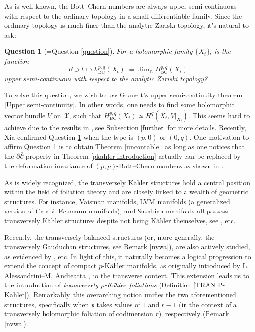 \documentclass[12pt]{amsart}
\numberwithin{equation}{section}
\theoremstyle{definition}
\theoremstyle{definition}
\theoremstyle{definition}
\renewcommand{\1}{\mathsf{1}}
\renewcommand{\>}{\rightarrow}
\newcommand{\p}{\partial}
\newcommand{\bp}{\overline\partial}
\def\p{\partial}
\theoremstyle{plain} %
\theoremstyle{plain} %
\newtheorem{bigque}{Question}
\theoremstyle{plain} %
\begin{document}
	As is well known,  the Bott--Chern numbers are  always upper semi-continuous with respect to the ordinary topology in a small differentiable family. Since the ordinary topology is much finer than  the analytic Zariski topology, it's natural to ask:
	\begin{bigque}[{=Question \ref{question}}] \label{question!!!}
		For a holomorphic family $\{X_t\}$,
		is the function
		$$B\ni t\longmapsto h^{p,q}_{\mathrm {BC}}(X_t):=\dim_{\mathbb{C}}H^{p,q}_{\mathrm {BC}}(X_t)$$
		upper semi-continuous with respect to the analytic Zariski topology?
	\end{bigque}
	
	To solve this question,  we wish to use Grauert's upper semi-continuity theorem \ref{Upper semi-continuity}. In other words, one needs to find some holomorphic vector bundle $V$ on $\mathcal X$, such that  $H^{p,q}_{\mathrm {BC}}(X_t)\simeq H^q(X_t,V|_{X_t}).$  This seems hard to achieve due to the results in \cite{Bg69,AN71}, see Subsection  \ref{further} for more details.  Recently,  Xia \cite[Theorem 1.1 and Remark 3.6]{Xi21a} confirmed Question \ref{question!!!} when the type is $(p,0)$ or $(0,q)$. One motivation to affirm  Question \ref{question!!!} is to obtain Theorem \ref{uncontable}, as long as one notices that the $\p\bp$-property in Theorem \ref{pkahler introduction} actually can be replaced by the deformation invariance of $(p,p)$-Bott--Chern numbers as shown in \cite[Remark 4.13]{RWZ21}.
	
	
	
	As is widely recognized, the transversely K\"ahler structures hold a central position within the field of foliation theory and   are closely linked to a wealth of geometric structures.  For instance, Vaisman manifolds, {LVM} manifolds (a generalized version of Calabi--Eckmann manifolds), and Sasakian manifolds all possess transversely K\"ahler structures despite not being K\"ahler themselves, see \cite{Me00,BG08,MSY08,No08,FOW09,OV22}, etc. 
    
    Recently, the transversely balanced structures (or, more generally, the transversely Gauduchon structures, see Remark \ref{nvwa}), are also actively studied, as evidenced by  \cite{FZ19,BH22}, etc. In light of this, it naturally becomes a logical progression to extend the concept of compact $p$-K\"ahler manifolds, as originally introduced by L. Alessandrini--M. Andreatta \cite[Definition 1.11]{AA87}, to the transverse context. This extension leads us to the introduction of \textit{transversely $p$-K\"ahler foliations} (Definition \ref{TRAN P-Kahler}). Remarkably, this overarching notion unifies the two aforementioned structures, specifically when $p$ takes values of $1$ and $r-1$ (in the context of a transversely holomorphic foliation of codimension $r$),
	respectively (Remark \ref{nvwa}). 
    
\end{document}

